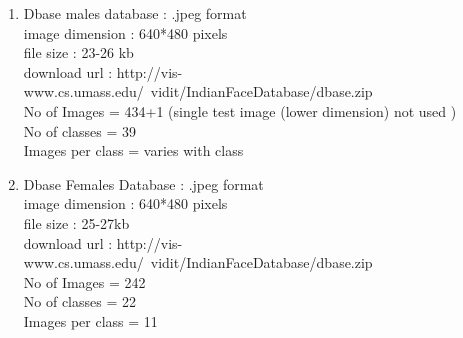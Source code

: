 \documentclass[10pt,a4paper]{article}
\begin{document}
\begin{enumerate}
\item Dbase males database : .jpeg format \\
   image dimension : 640*480 pixels \\
   file size : 23-26 kb \\
   download url : http://vis-www.cs.umass.edu/~vidit/IndianFaceDatabase/dbase.zip  \\
   No of Images = 434+1 (single test image (lower dimension) not used ) \\
   No of classes = 39 \\
   Images per class = varies with class \\

\item Dbase Females Database : .jpeg format \\
   image dimension : 640*480 pixels \\
   file size : 25-27kb \\
   download url : http://vis-www.cs.umass.edu/~vidit/IndianFaceDatabase/dbase.zip \\
   No of Images = 242 \\
   No of classes = 22 \\
   Images per class = 11 \\

\end{enumerate}
\end{document}
